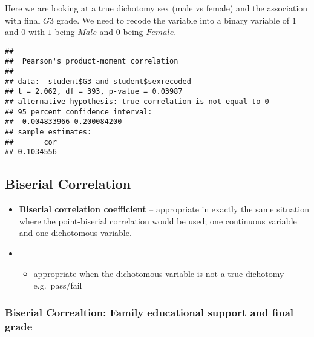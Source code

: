 \documentclass[
]{book}
\newenvironment{Shaded}{\begin{snugshade}}{\end{snugshade}}
\newcommand{\DecValTok}[1]{\textcolor[rgb]{0.00,0.00,0.81}{#1}}
\newcommand{\FunctionTok}[1]{\textcolor[rgb]{0.13,0.29,0.53}{\textbf{#1}}}
\newcommand{\NormalTok}[1]{#1}
\newcommand{\OtherTok}[1]{\textcolor[rgb]{0.56,0.35,0.01}{#1}}
\newcommand{\SpecialCharTok}[1]{\textcolor[rgb]{0.81,0.36,0.00}{\textbf{#1}}}
\newcommand{\StringTok}[1]{\textcolor[rgb]{0.31,0.60,0.02}{#1}}
\providecommand{\tightlist}{%
  \setlength{\itemsep}{0pt}\setlength{\parskip}{0pt}}
\theoremstyle{definition}
\theoremstyle{definition}
\theoremstyle{definition}
\theoremstyle{definition}
\theoremstyle{remark}
\begin{document}
Here we are looking at a true dichotomy sex (male vs female) and the association with final \(G3\) grade. We need to recode the variable into a binary variable of \(1\) and \(0\) with \(1\) being \(Male\) and \(0\) being \(Female\).

\begin{Shaded}
\end{Shaded}

\begin{verbatim}
## 
##  Pearson's product-moment correlation
## 
## data:  student$G3 and student$sexrecoded
## t = 2.062, df = 393, p-value = 0.03987
## alternative hypothesis: true correlation is not equal to 0
## 95 percent confidence interval:
##  0.004833966 0.200084200
## sample estimates:
##       cor 
## 0.1034556
\end{verbatim}

\hypertarget{biserial-correlation}{%
\subsection{Biserial Correlation}\label{biserial-correlation}}

\begin{itemize}
\item
  \textbf{Biserial correlation coefficient} -- appropriate in exactly the same situation where the point-biserial correlation would be used; one continuous variable and one dichotomous variable.
\item
  \begin{itemize}
  \tightlist
  \item
    appropriate when the dichotomous variable is not a true dichotomy e.g.~pass/fail
  \end{itemize}
\end{itemize}

\hypertarget{biserial-correaltion-family-educational-support-and-final-grade}{%
\subsubsection{Biserial Correaltion: Family educational support and final grade}\label{biserial-correaltion-family-educational-support-and-final-grade}}
\end{document}

